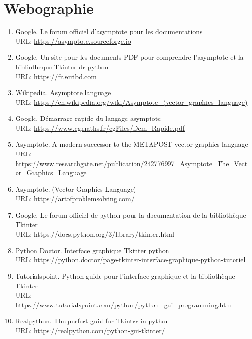\documentclass[a4paper]{report}
\newcommand{\link}[1]{{\color{blue}\href{#1}{#1}}}
\begin{document}
\chapter*{Webographie}
\begin{enumerate}
    \item Google. Le forum officiel d'asymptote pour les documentations\\
    URL: \link{https://asymptote.sourceforge.io}
    \item Google. Un site pour les documents PDF pour comprendre l'asymptote et la bibliotheque Tkinter de python\\
    URL: \link{https://fr.scribd.com}
    \item Wikipedia. Asymptote language\\
    URL: \link{https://en.wikipedia.org/wiki/Asymptote_(vector_graphics_language)}
    \item Google. Démarrage rapide du langage asymptote\\
    URL: \link{https://www.cgmaths.fr/cgFiles/Dem_Rapide.pdf}
    \item Asymptote. A modern successor to the METAPOST vector graphics language\\
    URL: \link{https://www.researchgate.net/publication/242776997_Asymptote_The_Vector_Graphics_Language}
    \item Asymptote. (Vector Graphics Language)\\
    URL: \link{https://artofproblemsolving.com/}
    \item Google. Le forum officiel de python pour la documentation de la bibliothèque Tkinter\\
    URL: \link{https://docs.python.org/3/library/tkinter.html}
    \item Python Doctor. Interface graphique Tkinter python\\
    URL: \link{https://python.doctor/page-tkinter-interface-graphique-python-tutoriel}
    \item Tutorialspoint. Python guide pour l'interface graphique et la bibliothèque Tkinter \\
    URL: \link{https://www.tutorialspoint.com/python/python_gui_programming.htm}
    \item Realpython. The perfect guid for Tkinter in python\\
    URL: \link{https://realpython.com/python-gui-tkinter/}
    
\end{enumerate}
\end{document}
